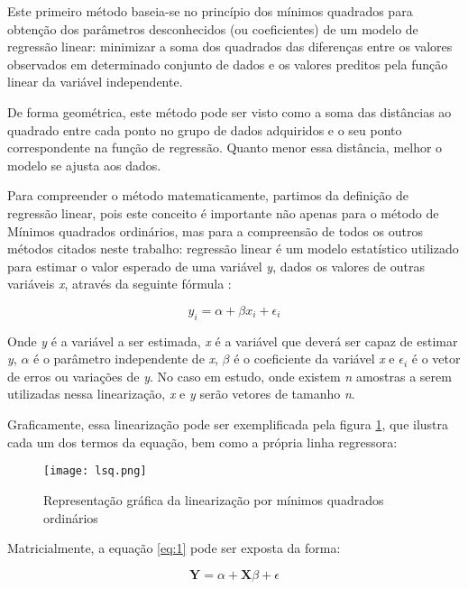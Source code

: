 Este primeiro método baseia-se no princípio dos mínimos quadrados para obtenção dos parâmetros desconhecidos (ou coeficientes) de um modelo de regressão linear: minimizar a soma dos quadrados das diferenças entre os valores observados em determinado conjunto de dados e os valores preditos pela função linear da variável independente.

De forma geométrica, este método pode ser visto como a soma das distâncias ao quadrado entre cada ponto no grupo de dados adquiridos e o seu ponto correspondente na função de regressão. Quanto menor essa distância, melhor o modelo se ajusta aos dados.

Para compreender o método matematicamente, partimos da definição de regressão linear, pois este conceito é importante não apenas para o método de Mínimos quadrados ordinários, mas para a compreensão de todos os outros métodos citados neste trabalho: regressão linear é um modelo estatístico utilizado para estimar o valor esperado de uma variável \textit{y}, dados os valores de outras variáveis \textit{x}, através da seguinte fórmula \cite{ols_intro_econometrics}:

\begin{equation}\label{eq:1}
y_i = \alpha + \beta x_i + \epsilon_i
\end{equation}

Onde \textit{y} é a variável a ser estimada, \textit{x} é a variável que deverá ser capaz de estimar \textit{y}, $\alpha$ é o parâmetro independente de \textit{x}, $\beta$ é o coeficiente da variável \textit{x} e $\epsilon_i$ é o vetor de erros ou variações de \textit{y}. No caso em estudo, onde existem \textit{n} amostras a serem utilizadas nessa linearização, \textit{x} e \textit{y} serão vetores de tamanho \textit{n}.

Graficamente, essa linearização pode ser exemplificada pela figura \ref{fig:ols_1}, que ilustra cada um dos termos da equação, bem como a própria linha regressora:

\begin{figure}[htp]
    \centering
    \texttt{[image: lsq.png]}
    \caption{Representação gráfica da linearização por mínimos quadrados ordinários}
    \label{fig:ols_1}
\end{figure}

Matricialmente, a equação \ref{eq:1} pode ser exposta da forma:

\begin{equation*} \textbf{Y}= \alpha + \textbf{X}\beta + \epsilon \end{equation*}

